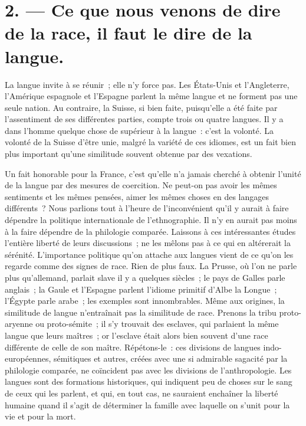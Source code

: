 \documentclass[twoside]{book} %
\newcommand\orgName[1]{#1}
\begin{document}
\section[{2. — Ce que nous venons de dire de la race, il faut le dire de la langue.}]{2. — Ce que nous venons de dire de la race, il faut le dire de la langue.}

\noindent La langue invite à se réunir ; elle n’y force pas. Les {\orgName États-Unis} et l’{\orgName Angleterre}, l’{\orgName Amérique espagnole} et l’{\orgName Espagne} parlent la même langue et ne forment pas une seule nation. Au contraire, la {\orgName Suisse}, si bien faite, puisqu’elle a été faite par l’assentiment de ses différentes parties, compte trois ou quatre langues. Il y a dans l’homme quelque chose de supérieur à la langue : c’est la volonté. La volonté de la {\orgName Suisse} d’être unie, malgré la variété de ces idiomes, est un fait bien plus important qu’une similitude souvent obtenue par des vexations.\par
Un fait honorable pour la {\orgName France}, c’est qu’elle n’a jamais cherché à obtenir l’unité de la langue par des mesures de coercition. Ne peut-on pas avoir les mêmes sentiments et les mêmes pensées, aimer les mêmes choses en des langages différents ? Nous parlions tout à l’heure de l’inconvénient qu’il y aurait à faire dépendre la politique internationale de l’ethnographie. Il n’y en aurait pas moins à la faire dépendre de la philologie comparée. Laissons à ces intéressantes études l’entière liberté de leurs discussions ; ne les mêlons pas à ce qui en altérerait la sérénité. L’importance politique qu’on attache aux langues vient de ce qu’on les regarde comme des signes de race. Rien de plus faux. La {\orgName Prusse}, où l’on ne parle plus qu’allemand, parlait slave il y a quelques siècles ; le {\orgName pays de Galles} parle anglais ; la {\orgName Gaule} et l’{\orgName Espagne} parlent l’idiome primitif d’{\orgName Albe la Longue} ; l’{\orgName Égypte} parle arabe ; les exemples sont innombrables. Même aux origines, la similitude de langue n’entraînait pas la similitude de race. Prenons la {\orgName tribu proto-aryenne} ou proto-sémite ; il s’y trouvait des esclaves, qui parlaient la même langue que leurs maîtres ; or l’esclave était alors bien souvent d’une race différente de celle de son maître. Répétons-le : ces divisions de langues indo-européennes, sémitiques et autres, créées avec une si admirable sagacité par la philologie comparée, ne coïncident pas avec les divisions de l’anthropologie. Les langues sont des formations historiques, qui indiquent peu de choses sur le sang de ceux qui les parlent, et qui, en tout cas, ne sauraient enchaîner la liberté humaine quand il s’agit de déterminer la famille avec laquelle on s’unit pour la vie et pour la mort.\par
\end{document}
